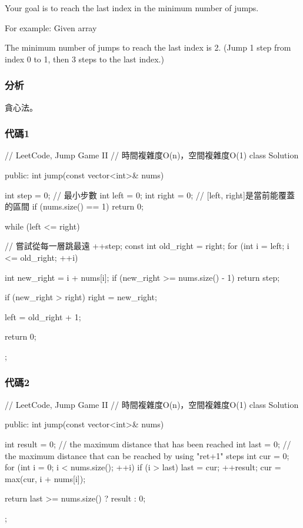 Your goal is to reach the last index in the minimum number of jumps.

For example:
Given array 

The minimum number of jumps to reach the last index is 2. (Jump 1 step from index 0 to 1, then 3 steps to the last index.)


\subsubsection{分析}
貪心法。


\subsubsection{代碼1}
\begin{Code}
// LeetCode, Jump Game II
// 時間複雜度O(n)，空間複雜度O(1)
class Solution {
public:
    int jump(const vector<int>& nums) {
        int step = 0; // 最小步數
        int left = 0;
        int right = 0;  // [left, right]是當前能覆蓋的區間
        if (nums.size() == 1) return 0;

        while (left <= right) { // 嘗試從每一層跳最遠
            ++step;
            const int old_right = right;
            for (int i = left; i <= old_right; ++i) {
                int new_right = i + nums[i];
                if (new_right >= nums.size() - 1) return step;

                if (new_right > right) right = new_right;
            }
            left = old_right + 1;
        }
        return 0;
    }
};
\end{Code}


\subsubsection{代碼2}
\begin{Code}
// LeetCode, Jump Game II
// 時間複雜度O(n)，空間複雜度O(1)
class Solution {
public:
    int jump(const vector<int>& nums) {
        int result = 0;
        // the maximum distance that has been reached
        int last = 0;
        // the maximum distance that can be reached by using "ret+1" steps
        int cur = 0;
        for (int i = 0; i < nums.size(); ++i) {
            if (i > last) {
                last = cur;
                ++result;
            }
            cur = max(cur, i + nums[i]);
        }

        return last >= nums.size() ? result : 0;
    }
};
\end{Code}


